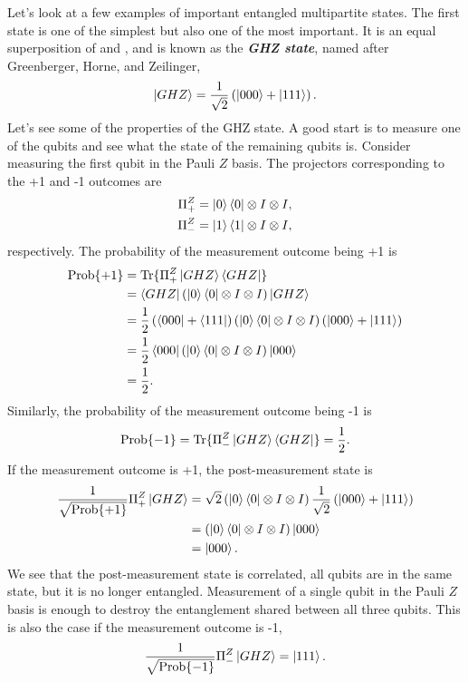 Let's look at a few examples of important entangled multipartite states.
The first state is one of the simplest but also one of the most important.
It is an equal superposition of  and , and is known as the \emph{\textbf{GHZ state}}, named after Greenberger, Horne, and Zeilinger,
\begin{equation}
    \left| GHZ \right\rangle = \frac{1}{\sqrt{2}} \left( \left| 000 \right\rangle + \left| 111 \right\rangle \right).
\end{equation}
Let's see some of the properties of the GHZ state.
A good start is to measure one of the qubits and see what the state of the remaining qubits is.
Consider measuring the first qubit in the Pauli $Z$ basis.
The projectors corresponding to the +1 and -1 outcomes are
\begin{align}
    \Pi^Z_+ & = \left| 0 \right\rangle\left\langle 0 \right| \otimes I \otimes I, \\
    \Pi^Z_- & = \left| 1 \right\rangle\left\langle 1 \right| \otimes I \otimes I,
\end{align}
respectively.
The probability of the measurement outcome being +1 is
\begin{align}
    \text{Prob} \{+1\} & = \text{Tr} \{ \Pi^Z_+ \left| GHZ \right\rangle\left\langle GHZ \right| \} \nonumber\\
    & = \left\langle GHZ \right| \left( \left| 0 \right\rangle\left\langle 0 \right| \otimes I \otimes I \right) \left| GHZ \right\rangle \nonumber\\
    & = \frac{1}{2} \left( \left\langle 000 \right| + \left\langle 111 \right| \right) \left( \left| 0 \right\rangle\left\langle 0 \right| \otimes I \otimes I \right) \left( \left| 000 \right\rangle + \left| 111 \right\rangle \right) \nonumber\\
     & = \frac{1}{2} \left\langle 000 \right| \left( \left| 0 \right\rangle\left\langle 0 \right| \otimes I \otimes I \right) \left| 000 \right\rangle \nonumber\\
     & = \frac{1}{2}.
\end{align}
Similarly, the probability of the measurement outcome being -1 is
\begin{equation}
    \text{Prob}\{-1\} = \text{Tr}\{\Pi^Z_-\left| GHZ \right\rangle\left\langle GHZ \right|\} = \frac{1}{2}.
\end{equation}
If the measurement outcome is +1, the post-measurement state is
\begin{align}
    \frac{1}{\sqrt{\text{Prob}\{+1\}}} \Pi^Z_+ \left| GHZ \right\rangle & = \sqrt{2} \left( \left| 0 \right\rangle\left\langle 0 \right| \otimes I \otimes I \right) \frac{1}{\sqrt{2}} \left( \left| 000 \right\rangle + \left| 111 \right\rangle \right) \nonumber\\
    & = \left( \left| 0 \right\rangle\left\langle 0 \right| \otimes I \otimes I \right) \left| 000 \right\rangle \nonumber\\
    & = \left| 000 \right\rangle.
\end{align}
We see that the post-measurement state is correlated, all qubits are in the same state, but it is no longer entangled.
Measurement of a single qubit in the Pauli $Z$ basis is enough to destroy the entanglement shared between all three qubits.
This is also the case if the measurement outcome is -1,
\begin{equation}
    \frac{1}{\sqrt{\text{Prob}\{-1\}}} \Pi^Z_- \left| GHZ \right\rangle = \left| 111 \right\rangle.
\end{equation}

